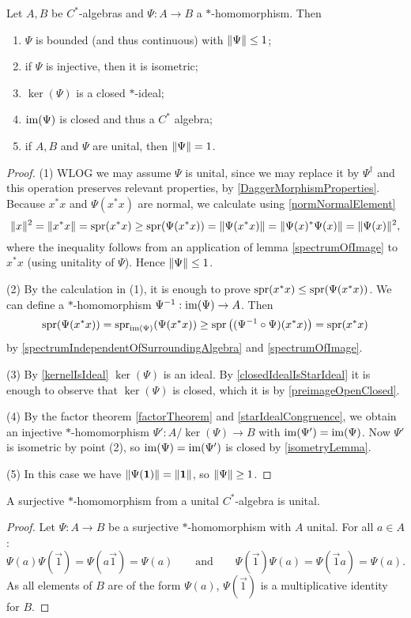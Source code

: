 \begin{proposition} \label{starHomomorphismCstarProperties}
Let $A,B$ be $C^*$-algebras and $\Psi: A\to B$ a $*$-homomorphism. Then
\begin{enumerate}
\item $\Psi$ is bounded (and thus continuous) with $\lVert\Psi\rVert \leq 1$;
\item if $\Psi$ is injective, then it is isometric;
\item $\ker(\Psi)$ is a closed $*$-ideal;
\item $\operatorname{im}(\Psi)$ is closed and thus a $C^*$ algebra;
\item if $A,B$ and $\Psi$ are unital, then $\lVert\Psi\rVert = 1$.
\end{enumerate}
\end{proposition}
\begin{proof}
(1) WLOG we may assume $\Psi$ is unital, since we may replace it by $\Psi^\dagger$ and this operation preserves relevant properties, by \ref{DaggerMorphismProperties}. Because $x^*x$ and $\Psi(x^*x)$ are normal, we calculate using \ref{normNormalElement}
\[ \lVert x\rVert^2 = \lVert x^*x\rVert = \operatorname{spr}(x^*x) \geq \operatorname{spr}(\Psi(x^*x)) = \lVert\Psi(x^*x)\rVert = \lVert\Psi(x)^*\Psi(x)\rVert = \lVert\Psi(x)\rVert^2, \]
where the inequality follows from an application of lemma \ref{spectrumOfImage} to $x^*x$ (using unitality of $\Psi$). Hence $\lVert\Psi\rVert\leq 1$.

(2) By the calculation in (1), it is enough to prove $\operatorname{spr}(x^*x) \leq \operatorname{spr}(\Psi(x^*x))$. We can define a $*$-homomorphism $\Psi^{-1}: \operatorname{im}(\Psi)\to A$. Then
\[ \operatorname{spr}(\Psi(x^*x)) = \operatorname{spr}_{\operatorname{im}(\Psi)}(\Psi(x^*x)) \geq \operatorname{spr}\big((\Psi^{-1}\circ\Psi)(x^*x)\big) = \operatorname{spr}(x^*x) \]
by \ref{spectrumIndependentOfSurroundingAlgebra} and \ref{spectrumOfImage}.

(3) By \ref{kernelIsIdeal} $\ker(\Psi)$ is an ideal. By \ref{closedIdealIsStarIdeal} it is enough to observe that $\ker(\Psi)$ is closed, which it is by \ref{preimageOpenClosed}.

(4) By the factor theorem \ref{factorTheorem} and \ref{starIdealCongruence}, we obtain an injective $*$-homomorphism $\Psi': A/\ker(\Psi) \to B$ with $\operatorname{im}(\Psi') = \operatorname{im}(\Psi)$. Now $\Psi'$ is isometric by point (2), so $\operatorname{im}(\Psi) = \operatorname{im}(\Psi')$ is closed by \ref{isometryLemma}.

(5) In this case we have $\lVert\Psi(\boldsymbol{\mathrm{1}})\rVert = \lVert\boldsymbol{\mathrm{1}}\rVert$, so $\lVert\Psi\rVert \geq 1$.
\end{proof}


\begin{lemma}
A surjective $*$-homomorphism from a unital $C^*$-algebra is unital.
\end{lemma}
\begin{proof}
Let $\Psi: A \to B$ be a surjective $*$-homomorphism with $A$ unital. For all $a\in A$:
\[ \Psi(a)\Psi(\vec{1}) = \Psi(a \vec{1}) = \Psi(a) \qquad \text{and} \qquad \Psi(\vec{1})\Psi(a) = \Psi(\vec{1} a) = \Psi(a). \]
As all elements of $B$ are of the form $\Psi(a)$, $\Psi(\vec{1})$ is a multiplicative identity for $B$.
\end{proof}

